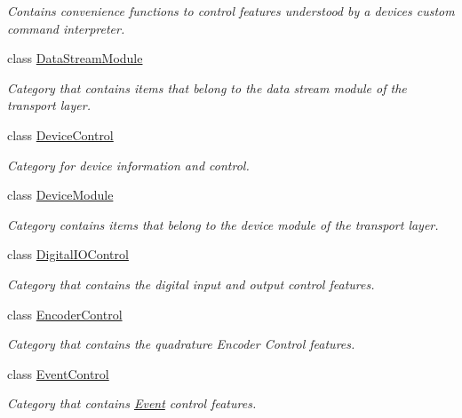 \begin{DoxyCompactItemize}
\begin{DoxyCompactList}\small\item\em Contains convenience functions to control features understood by a devices custom command interpreter. \end{DoxyCompactList}\item 
class \hyperlink{classmv_i_m_p_a_c_t_1_1acquire_1_1_gen_i_cam_1_1_data_stream_module}{Data\+Stream\+Module}
\begin{DoxyCompactList}\small\item\em Category that contains items that belong to the data stream module of the transport layer. \end{DoxyCompactList}\item 
class \hyperlink{classmv_i_m_p_a_c_t_1_1acquire_1_1_gen_i_cam_1_1_device_control}{Device\+Control}
\begin{DoxyCompactList}\small\item\em Category for device information and control. \end{DoxyCompactList}\item 
class \hyperlink{classmv_i_m_p_a_c_t_1_1acquire_1_1_gen_i_cam_1_1_device_module}{Device\+Module}
\begin{DoxyCompactList}\small\item\em Category contains items that belong to the device module of the transport layer. \end{DoxyCompactList}\item 
class \hyperlink{classmv_i_m_p_a_c_t_1_1acquire_1_1_gen_i_cam_1_1_digital_i_o_control}{Digital\+I\+O\+Control}
\begin{DoxyCompactList}\small\item\em Category that contains the digital input and output control features. \end{DoxyCompactList}\item 
class \hyperlink{classmv_i_m_p_a_c_t_1_1acquire_1_1_gen_i_cam_1_1_encoder_control}{Encoder\+Control}
\begin{DoxyCompactList}\small\item\em Category that contains the quadrature Encoder Control features. \end{DoxyCompactList}\item 
class \hyperlink{classmv_i_m_p_a_c_t_1_1acquire_1_1_gen_i_cam_1_1_event_control}{Event\+Control}
\begin{DoxyCompactList}\small\item\em Category that contains \hyperlink{classmv_i_m_p_a_c_t_1_1acquire_1_1_event}{Event} control features. \end{DoxyCompactList}\item 

\end{DoxyCompactItemize}
